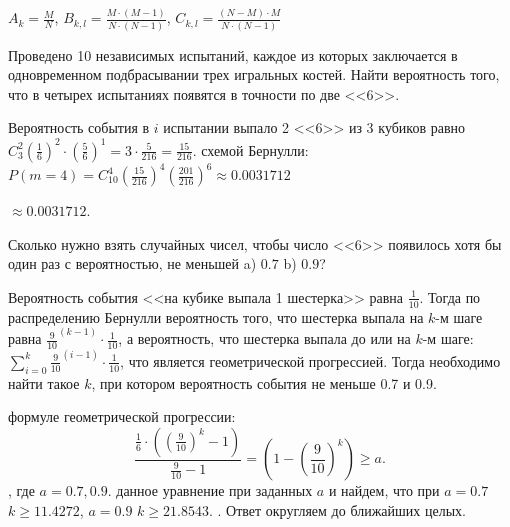 \begin{result}
$A_k = \frac{M}{N}$, $B_{k,l} = \frac{M \cdot \left(M - 1\right) }{N \cdot (N - 1)}$, $C_{k,l} 
  = \frac{\left(N - M\right) \cdot M}{N \cdot \left(N - 1\right) }$
\end{result}

\medskip
\begin{task}{4}
Проведено 10 независимых испытаний, каждое из которых заключается в одновременном подбрасывании трех 
игральных костей. Найти вероятность того, что в четырех испытаниях появятся в точности по две <<6>>.
\end{task}

\begin{solution}
Вероятность события в $i$ испытании выпало 2 <<6>> из 3 кубиков равно 
$C_3^2 \left(\frac{1}{6}\right)^2 \cdot \left(\frac{5}{6}\right)^1 = 3 \cdot \frac{5}{216} = \frac{15}{216}$.
\medskip
{} схемой Бернулли: $P(m = 4) = C_{10}^4 \left(\frac{15}{216}\right)^4 \left(\frac{201}{216}\right)^6 \approx 0.0031712$
\end{solution}

\begin{result}
$\approx 0.0031712$.
\end{result}

\medskip
\begin{task}{6}
Сколько нужно взять случайных чисел, чтобы число <<6>> появилось хотя бы один раз с вероятностью,
не меньшей a) $0.7$ b) $0.9$?
\end{task}

\begin{solution}
Вероятность события <<на кубике выпала 1 шестерка>> равна $\frac{1}{10}$. Тогда по распределению Бернулли
вероятность того, что шестерка выпала на $k$-м шаге равна  $\frac{9}{10}^{(k - 1)} \cdot \frac{1}{10}$, а
вероятность, что шестерка выпала до или на $k$-м шаге: $\sum_{i = 0}^k \frac{9}{10}^{(i - 1)} \cdot \frac{1}{10}$,
что является геометрической прогрессией. Тогда необходимо найти такое $k$, при котором вероятность
события не меньше 0.7 и 0.9.

\medskip
{} формуле геометрической прогрессии:
\[
  \frac{\frac{1}{6} \cdot \left(\left(\frac{9}{10}\right)^k - 1\right)}{\frac{9}{10} - 1} = 
  \left(1 - \left(\frac{9}{10}\right)^k\right) \ge  a
.\], где $a = {0.7, 0.9}$.
\smallskip
{} данное уравнение при заданных $a$ и найдем, что при $a = 0.7$ $k \ge 11.4272$, $a = 0.9$ $k \ge 21.8543$.
. Ответ округляем до ближайших целых.
\end{solution}

